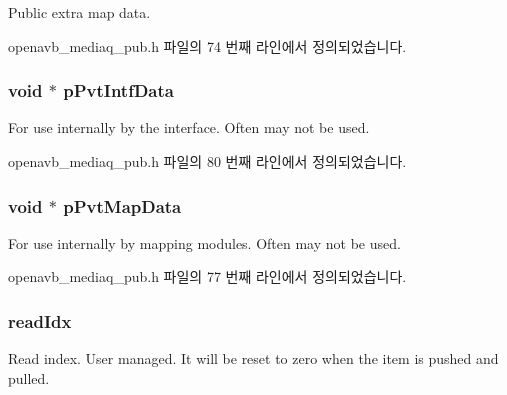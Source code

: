 Public extra map data. 



openavb\+\_\+mediaq\+\_\+pub.\+h 파일의 74 번째 라인에서 정의되었습니다.

\subsubsection[{\texorpdfstring{p\+Pvt\+Intf\+Data}{pPvtIntfData}}]{\setlength{\rightskip}{0pt plus 5cm}void $\ast$ p\+Pvt\+Intf\+Data}\hypertarget{structmedia__q__item__t_a44191a670acf801794664815b343674d}{}\label{structmedia__q__item__t_a44191a670acf801794664815b343674d}


For use internally by the interface. Often may not be used. 



openavb\+\_\+mediaq\+\_\+pub.\+h 파일의 80 번째 라인에서 정의되었습니다.

\subsubsection[{\texorpdfstring{p\+Pvt\+Map\+Data}{pPvtMapData}}]{\setlength{\rightskip}{0pt plus 5cm}void $\ast$ p\+Pvt\+Map\+Data}\hypertarget{structmedia__q__item__t_af23c5feee139b93f1c9dfcb56f1eaa1d}{}\label{structmedia__q__item__t_af23c5feee139b93f1c9dfcb56f1eaa1d}


For use internally by mapping modules. Often may not be used. 



openavb\+\_\+mediaq\+\_\+pub.\+h 파일의 77 번째 라인에서 정의되었습니다.

\subsubsection[{\texorpdfstring{read\+Idx}{readIdx}}]{ read\+Idx}\hypertarget{structmedia__q__item__t_a7581457a4c56a2aa1f2c76cdc2309d6b}{}\label{structmedia__q__item__t_a7581457a4c56a2aa1f2c76cdc2309d6b}
Read index. User managed. It will be reset to zero when the item is pushed and pulled. 

